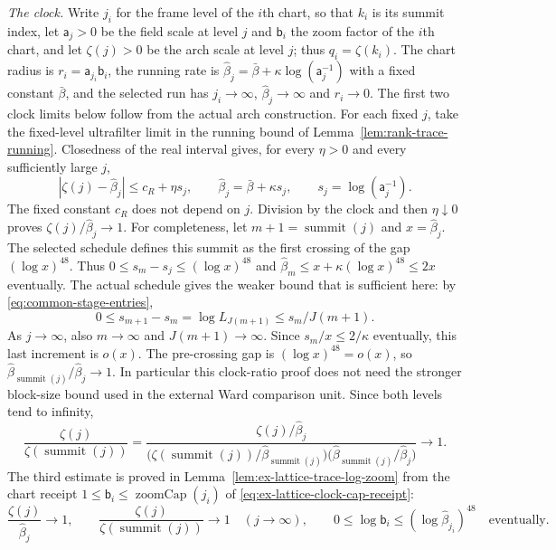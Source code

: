 \emph{The clock.} Write $j_i$ for the frame level of the $i$th chart, so
that $k_i$ is its summit index, let $\mathsf a_j>0$ be the field scale at
level $j$ and $\mathsf b_i$ the zoom factor of the $i$th chart, and let
$\zeta(j)>0$ be the arch scale at level $j$; thus $q_i=\zeta(k_i)$. The
chart radius is $r_i=\mathsf a_{j_i}\mathsf b_i$, the running rate is
$\widehat\beta_j=\bar\beta+\kappa\log(\mathsf a_j^{-1})$ with a fixed
constant $\bar\beta$, and the selected run has $j_i\to\infty$,
$\widehat\beta_j\to\infty$ and $r_i\to0$. The first two clock limits
below follow from the actual arch construction. For each fixed $j$,
take the fixed-level ultrafilter limit in the running bound of
Lemma~\ref{lem:rank-trace-running}. Closedness of the real interval gives,
for every $\eta>0$ and every sufficiently large $j$,
\[
 |\zeta(j)-\widehat\beta_j|\le c_R+\eta s_j,
 \qquad \widehat\beta_j=\bar\beta+\kappa s_j,
 \qquad s_j=\log(\mathsf a_j^{-1}).
\]
The fixed constant $c_R$ does not depend on $j$. Division by the clock
and then $\eta\downarrow0$ proves $\zeta(j)/\widehat\beta_j\to1$.
For completeness, let $m+1=\operatorname{summit}(j)$ and
$x=\widehat\beta_j$. The selected schedule defines this summit as the
first crossing of the gap $(\log x)^{48}$. Thus
$0\le s_m-s_j\le(\log x)^{48}$ and
$\widehat\beta_m\le x+\kappa(\log x)^{48}\le2x$ eventually.
The actual schedule gives the weaker bound that is sufficient here:
by \eqref{eq:common-stage-entries},
\[
 0\le s_{m+1}-s_m=\log L_{J(m+1)}
       \le s_m/J(m+1).
\]
As $j\to\infty$, also $m\to\infty$ and $J(m+1)\to\infty$.
Since $s_m/x\le2/\kappa$ eventually, this last increment is $o(x)$.
The pre-crossing gap is $(\log x)^{48}=o(x)$, so
$\widehat\beta_{\operatorname{summit}(j)}/\widehat\beta_j\to1$.
In particular this clock-ratio proof does not need the stronger
block-size bound used in the external Ward comparison unit.
Since both levels tend to infinity,
\[
 \frac{\zeta(j)}{\zeta(\operatorname{summit}(j))}
 =\frac{\zeta(j)/\widehat\beta_j}
 {\bigl(\zeta(\operatorname{summit}(j))/
          \widehat\beta_{\operatorname{summit}(j)}\bigr)
  \bigl(\widehat\beta_{\operatorname{summit}(j)}/\widehat\beta_j\bigr)}
 \longrightarrow1.
\]
The third estimate is proved in
Lemma~\ref{lem:ex-lattice-trace-log-zoom} from the chart receipt
$1\le\mathsf b_i\le\operatorname{zoomCap}(j_i)$
of \eqref{eq:ex-lattice-clock-cap-receipt}:
\begin{equation}
 \frac{\zeta(j)}{\widehat\beta_j}\longrightarrow1,\qquad
 \frac{\zeta(j)}{\zeta(\operatorname{summit}(j))}\longrightarrow1
 \quad(j\to\infty),\qquad
 0\le\log\mathsf b_i\le(\log\widehat\beta_{j_i})^{48}
 \quad\text{eventually}.
 \label{eq:ex-lattice-scribe-clock-inputs}
\end{equation}
